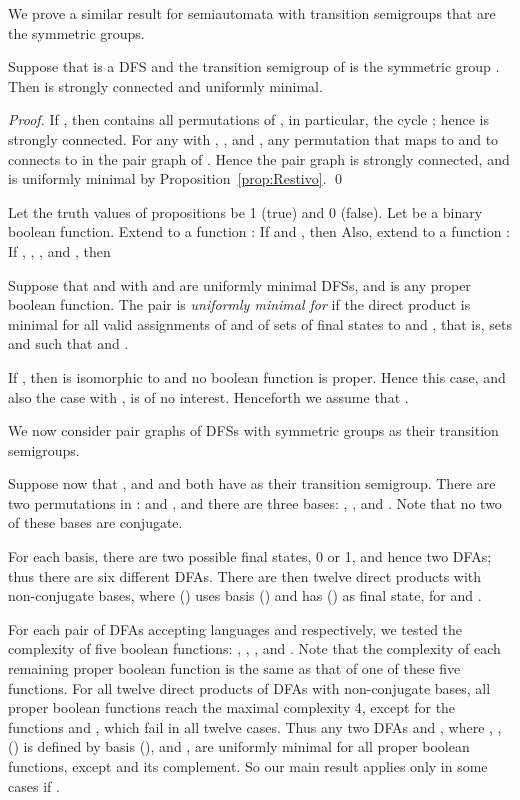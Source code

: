 \documentclass{llncs}
\newcommand{\qedb}{\hfill}
\begin{document}
We prove a similar result for semiautomata   with transition semigroups  that are the symmetric groups. 

\begin{proposition}
\label{prop:DFS}
Suppose that  is a DFS and the transition semigroup  of  is the symmetric group . Then  is strongly connected and uniformly minimal.
\end{proposition}
\begin{proof}
If  , then  contains all permutations of , in particular, the cycle ; hence  is strongly connected. For any  with , , and ,  any permutation that maps  to  and  to  connects  to  in the pair graph of . Hence the pair graph is strongly connected, and  is uniformly minimal by Proposition~\ref{prop:Restivo}.
\qed
\end{proof}


Let the truth values of propositions be 1 (true) and 0 (false). Let  be a binary boolean function.
Extend  to a function
:
If  and , 
then 
Also, extend  to a function
:
If , , , and , 
then 


Suppose that  and  with  and  are uniformly minimal DFSs, and 
 is any proper boolean function.
The pair    is \emph{uniformly minimal for }
if the direct product 
is minimal for all valid assignments of  and  of sets of final states to  and , that is, sets  and  such that  and .

If ,  then  is isomorphic to  and  no
boolean function  is proper.
Hence this case, and also the case with , is of no interest.
Henceforth we assume that  .

We now consider  pair graphs of DFSs with symmetric groups as their transition semigroups.  

\begin{example}
\label{ex:22}
Suppose now that , and  and  both have  as their transition semigroup.
There are two permutations in :  and , and 
there are  three bases:  ,
, and
.
Note that no two of these bases are conjugate.

For each basis, there are two possible final states, 0 or 1, and  hence  two DFAs; thus there are six different DFAs.
There are then twelve direct products  with non-conjugate bases, where
 () uses basis  () and has  () as final state, for  and .

For each pair of DFAs accepting languages  and  respectively, we tested the complexity of five boolean functions: 
,  ,  ,  and . Note that the complexity of each remaining proper boolean function is the same as that of one of these five functions.
For all twelve direct products of DFAs with non-conjugate bases, all proper boolean functions reach the maximal complexity 4, except for the functions  and , which fail in all twelve cases.
Thus any two DFAs  and , where
, ,  () is defined by basis  (),
 and , are uniformly minimal for all proper boolean functions, except  and its complement. So our main result applies only in some cases if .
\qedb
\end{example}
\end{document}
